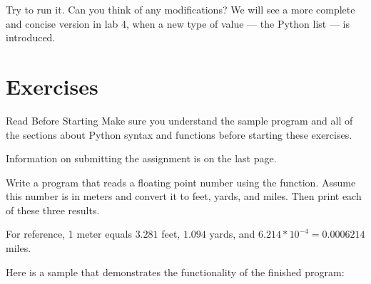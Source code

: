 \documentclass[11pt]{cselabheader}
\begin{document}

Try to run it. Can you think of any modifications?  We will see a more
complete and concise version in lab 4, when a new type of value ---
the Python list --- is introduced.

\newpage

\section{Exercises}\label{exercises}

\begin{warningbox}{Read Before Starting}
Make sure you understand the sample program and all of the sections about
Python syntax and functions before starting these exercises.

Information on submitting the assignment is on the last page.
\end{warningbox}

\begin{ex}[conversion.py]
  Write a program that reads a floating point number using the
 function. Assume this number is in meters and
convert it to feet, yards, and miles. Then print each of these three
results.

  For reference, 1 meter equals $3.281$ feet, $1.094$ yards, and $6.214 * 10^{-4} = 0.0006214$ miles.

  Here is a sample that demonstrates the functionality of the finished program:

\end{ex}
\end{document}
